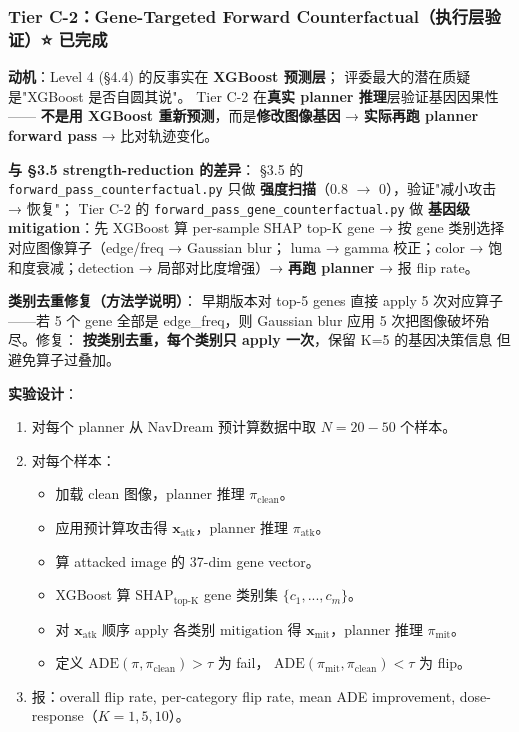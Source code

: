 \documentclass[a4paper,12pt,fontset=fandol]{ctexart}
\begin{document}
{\subsubsection{Tier C-2：Gene-Targeted Forward Counterfactual（执行层验证）⭐ 已完成}

\noindent\textbf{动机}：Level 4 (§4.4) 的反事实在 \textbf{XGBoost 预测层}；
评委最大的潜在质疑是"XGBoost 是否自圆其说"。
Tier C-2 在\textbf{真实 planner 推理}层验证基因因果性——
\textbf{不是用 XGBoost 重新预测}，而是\textbf{修改图像基因} →
\textbf{实际再跑 planner forward pass} → 比对轨迹变化。

\noindent\textbf{与 §3.5 strength-reduction 的差异}：
§3.5 的 \texttt{forward\_pass\_counterfactual.py} 只做
\textbf{强度扫描}（0.8 $\to$ 0），验证"减小攻击 → 恢复"；
Tier C-2 的 \texttt{forward\_pass\_gene\_counterfactual.py} 做
\textbf{基因级 mitigation}：先 XGBoost 算 per-sample SHAP top-K gene →
按 gene 类别选择对应图像算子（edge/freq → Gaussian blur；
luma → gamma 校正；color → 饱和度衰减；detection → 局部对比度增强）→
\textbf{再跑 planner} → 报 flip rate。

\noindent\textbf{类别去重修复（方法学说明）}：
早期版本对 top-5 genes 直接 apply 5 次对应算子——若 5 个 gene 全部是
edge\_freq，则 Gaussian blur 应用 5 次把图像破坏殆尽。修复：
\textbf{按类别去重，每个类别只 apply 一次}，保留 K=5 的基因决策信息
但避免算子过叠加。

\noindent\textbf{实验设计}：
\begin{enumerate}[leftmargin=*]
\item 对每个 planner 从 NavDream 预计算数据中取 $N\!=\!20\!-\!50$ 个样本。
\item 对每个样本：
  \begin{itemize}
  \item 加载 clean 图像，planner 推理 $\pi_{\text{clean}}$。
  \item 应用预计算攻击得 $\mathbf{x}_{\text{atk}}$，planner 推理 $\pi_{\text{atk}}$。
  \item 算 attacked image 的 37-dim gene vector。
  \item XGBoost 算 $\text{SHAP}_{\text{top-K}}$ gene 类别集 $\{c_1, ..., c_m\}$。
  \item 对 $\mathbf{x}_{\text{atk}}$ 顺序 apply 各类别 $\text{mitigation}$ 得
        $\mathbf{x}_{\text{mit}}$，planner 推理 $\pi_{\text{mit}}$。
  \item 定义 $\text{ADE}(\pi, \pi_{\text{clean}}) > \tau$ 为 fail，
        $\text{ADE}(\pi_{\text{mit}}, \pi_{\text{clean}}) < \tau$ 为 flip。
  \end{itemize}
\item 报：overall flip rate, per-category flip rate, mean ADE improvement,
      dose-response（$K\!=\!1, 5, 10$）。
\end{enumerate}

}
\end{document}
